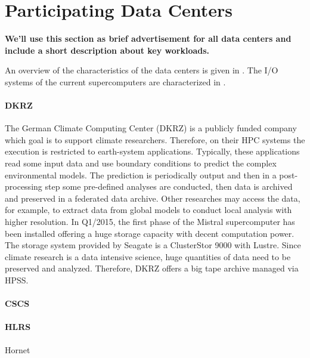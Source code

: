 \documentclass{superfri}
\numberwithin{equation}{section}
\begin{document}
\section{Participating Data Centers}
\label{sec:centers}

\textbf{We'll use this section as brief advertisement for all data centers and include a short description about key workloads.}

An overview of the characteristics of the data centers is given in .
The I/O systems of the current supercomputers are characterized in .

\paragraph{DKRZ}
The German Climate Computing Center (DKRZ) is a publicly funded company 
which goal is to support climate researchers.
Therefore, on their HPC systems the execution is restricted to earth-system applications.
Typically, these applications read some input data and use boundary conditions to predict the complex environmental models.
The prediction is periodically output and then in a post-processing step some pre-defined analyses are conducted, then data is archived and preserved in a federated data archive. 
Other researches may access the data, for example, to extract data from global models to conduct local analysis with higher resolution.
In Q1/2015, the first phase of the Mistral supercomputer has been installed offering a huge storage capacity with decent 
computation power.
The storage system provided by Seagate is a ClusterStor 9000 with Lustre.
Since climate research is a data intensive science, huge quantities of data need to be preserved and analyzed.
Therefore, DKRZ offers a big tape archive managed via HPSS.



\paragraph{CSCS}

\paragraph{HLRS}
Hornet

\end{document}
